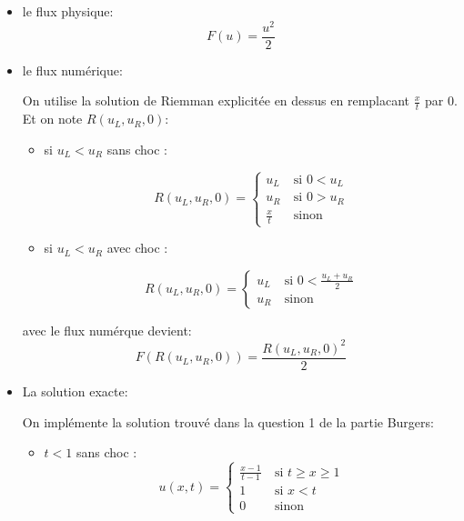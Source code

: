 \begin{itemize}
\item le flux physique:
 $$F(u) = \frac {u^2 }{2}$$
\item le flux num\'erique:

On utilise la solution de Riemman explicit\'ee en dessus en remplacant $\frac{x}{t}$ par 0. Et on note $R(u_L,u_R,0)$:

\begin{itemize}

\item si $u_L<u_R$  sans choc : 

\begin{equation}
\label{systeme}
R(u_L,u_R,0) =
\left \lbrace \begin{array}{rl}
u_L & ~\text{si }  0< u_L\\
u_R & ~\text{si }  0 > u_R\\
\frac{x}{t} & ~\text{sinon} 
\end{array}\right.
\end{equation}

\item si $u_L<u_R$  avec choc : 


\begin{equation}
\label{systeme}
R(u_L,u_R,0) =
\left \lbrace \begin{array}{rl}
u_L & ~\text{si }  0 < \frac{u_L + u_R}{2}\\
u_R & ~\text{sinon }  
\end{array}\right.
\end{equation}

\end{itemize}

avec le flux num\'erque devient:
$$F(R(u_L,u_R,0)) = \frac {R(u_L,u_R,0)^2 }{2}$$

\item La solution exacte: 

On impl\'emente la solution trouv\'e dans la question 1 de la partie Burgers:

\begin{itemize}

\item $t <  1$ sans choc : 
\begin{equation}
\label{systeme}
 u(x,t) =
\left \lbrace \begin{array}{rl}
\frac{x-1}{t-1} & ~\text{si }  t \geq x \geq 1\\
1 & ~\text{si }  x <  t\\
0 & ~\text{sinon} 
\end{array}\right.
\end{equation}


\end{itemize}
\end{itemize}
